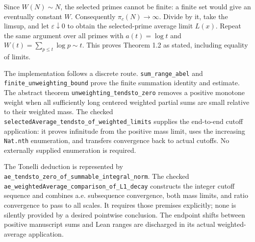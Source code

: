 Since $W(N)\sim N$, the selected primes cannot be finite: a finite set would give an eventually constant $W$. Consequently $\pi_c(N)\to\infty$. Divide by it, take the limsup, and let $\varepsilon\downarrow0$ to obtain the selected-prime average limit $L(x)$. Repeat the same argument over all primes with $a(t)=\log t$ and $W(t)=\sum_{p\leq t}\log p\sim t$. This proves Theorem 1.2 as stated, including equality of limits.

The implementation follows a discrete route. \texttt{sum\_\allowbreak{}range\_\allowbreak{}abel} and \texttt{finite\_\allowbreak{}unweighting\_\allowbreak{}bound} prove the finite summation identity and estimate. The abstract theorem \texttt{unweighting\_\allowbreak{}tendsto\_\allowbreak{}zero} removes a positive monotone weight when all sufficiently long centered weighted partial sums are small relative to their weighted mass. The checked \texttt{selectedAverage\_\allowbreak{}tendsto\_\allowbreak{}of\_\allowbreak{}weighted\_\allowbreak{}limits} supplies the end-to-end cutoff application: it proves infinitude from the positive mass limit, uses the increasing \texttt{Nat.nth} enumeration, and transfers convergence back to actual cutoffs. No externally supplied enumeration is required.

The Tonelli deduction is represented by \texttt{ae\_\allowbreak{}tendsto\_\allowbreak{}zero\_\allowbreak{}of\_\allowbreak{}summable\_\allowbreak{}integral\_\allowbreak{}norm}. The checked \texttt{ae\_\allowbreak{}weightedAverage\_\allowbreak{}comparison\_\allowbreak{}of\_\allowbreak{}L1\_\allowbreak{}decay} constructs the integer cutoff sequence and combines a.e. subsequence convergence, both mass limits, and ratio convergence to pass to all scales. It requires those premises explicitly; none is silently provided by a desired pointwise conclusion. The endpoint shifts between positive manuscript sums and Lean ranges are discharged in its actual weighted-average application.

